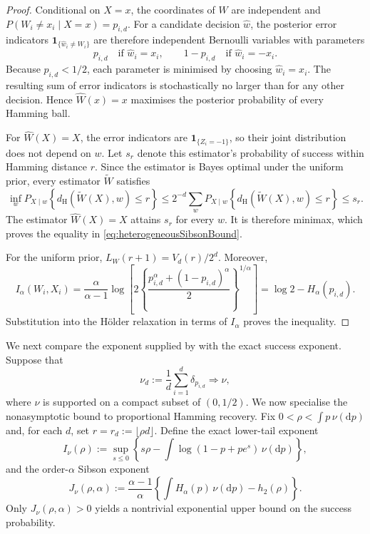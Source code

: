 \documentclass[11pt]{article}
\theoremstyle{definition}
\theoremstyle{remark}
\newcommand{\1}{\boldsymbol{1}}
\begin{document}
\begin{proof}
Conditional on \(X=x\), the coordinates of \(W\) are independent and
\(P(W_i\neq x_i\mid X=x)=p_{i,d}\). For a candidate decision
\(\widehat w\), the posterior error indicators
\(\1_{\{\widehat w_i\neq W_i\}}\) are therefore independent Bernoulli
variables with parameters
\[
p_{i,d}
\quad\text{if }\widehat w_i=x_i,
\qquad
1-p_{i,d}
\quad\text{if }\widehat w_i=-x_i.
\]
Because \(p_{i,d}<1/2\), each parameter is minimised by choosing
\(\widehat w_i=x_i\). The resulting sum of error indicators is
stochastically no larger than for any other decision. Hence
\(\widehat W(x)=x\) maximises the posterior probability of every Hamming
ball.

For \(\widehat W(X)=X\), the error indicators are
\(\1_{\{Z_i=-1\}}\), so their joint distribution does not depend on
\(w\). Let \(s_r\) denote this estimator's probability of success within
Hamming distance \(r\). Since the estimator is Bayes optimal under the uniform
prior, every estimator \(\widetilde W\) satisfies
\[
\inf_w
P_{X\mid w}\!\left\{
d_{\mathrm H}(\widetilde W(X),w)\le r
\right\}
\le
2^{-d}\sum_w
P_{X\mid w}\!\left\{
d_{\mathrm H}(\widetilde W(X),w)\le r
\right\}
\le s_r.
\]
The estimator \(\widehat W(X)=X\) attains \(s_r\) for every \(w\).
It is therefore minimax, which proves the equality in
\eqref{eq:heterogeneousSibsonBound}.

For the uniform prior,
\(L_W(r+1)=V_d(r)/2^d\). Moreover,
\[
I_\alpha(W_i,X_i)
=
\frac{\alpha}{\alpha-1}
\log\left[
2\left\{
\frac{p_{i,d}^\alpha+(1-p_{i,d})^\alpha}{2}
\right\}^{1/\alpha}
\right]
=
\log2-H_\alpha(p_{i,d}).
\]
Substitution into the H\"older relaxation in terms of \(I_\alpha\) proves the
inequality.
\end{proof}

We next compare the exponent supplied by
 with the exact success exponent.
Suppose that
\[
\nu_d:=\frac1d\sum_{i=1}^d\delta_{p_{i,d}}
\Longrightarrow\nu,
\]
where \(\nu\) is supported on a compact subset of \((0,1/2)\). We now specialise the nonasymptotic bound to proportional Hamming
recovery. Fix \(0<\rho<\int p\,\nu(\mathrm dp)\) and, for each \(d\),
set \(r=r_d:=\lfloor\rho d\rfloor\).
Define the exact lower-tail exponent
\begin{equation}
I_\nu(\rho)
:=
\sup_{s\le0}
\left\{
s\rho-
\int\log(1-p+pe^s)\,\nu(\mathrm dp)
\right\},
\label{eq:heterogeneousExactExponent}
\end{equation}
and the order-\(\alpha\) Sibson exponent
\begin{equation}
J_\nu(\rho,\alpha)
:=
\frac{\alpha-1}{\alpha}
\left\{
\int H_\alpha(p)\,\nu(\mathrm dp)-h_2(\rho)
\right\}.
\label{eq:heterogeneousSibsonExponent}
\end{equation}
Only $J_\nu(\rho,\alpha)>0$ yields a nontrivial exponential upper bound
on the success probability.
\end{document}
